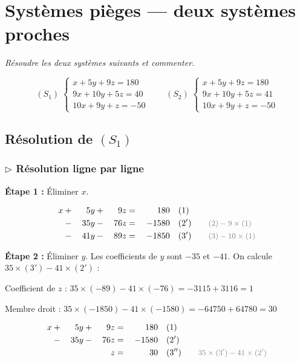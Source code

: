 \documentclass[12pt,a4paper]{article}
\newcommand{\ann}[1]{\qquad\textcolor{opcolor}{\text{\small #1}}}
\begin{document}
\section{Systèmes pièges --- deux systèmes proches}

\textit{Résoudre les deux systèmes suivants et commenter.}

\[
(S_1) \;
\begin{cases}
  x + 5y + 9z = 180 \\
  9x + 10y + 5z = 40 \\
  10x + 9y + z = -50
\end{cases}
\qquad
(S_2) \;
\begin{cases}
  x + 5y + 9z = 180 \\
  9x + 10y + 5z = 41 \\
  10x + 9y + z = -50
\end{cases}
\]

\subsection*{Résolution de $(S_1)$}

\subsubsection*{$\triangleright$ Résolution ligne par ligne}

\textbf{Étape 1 :} Éliminer $x$.

\begin{alignat*}{4}
  x &{}+{}&  5y  &{}+{}&  9z  &{}={}&  180   &\quad (1)\\
    &{}-{}& 35y  &{}-{}& 76z  &{}={}& -1580  &\quad (2') \ann{$(2)-9\times(1)$}\\
    &{}-{}& 41y  &{}-{}& 89z  &{}={}& -1850  &\quad (3') \ann{$(3)-10\times(1)$}
\end{alignat*}

\textbf{Étape 2 :} Éliminer $y$. Les coefficients de $y$ sont $-35$ et $-41$. On calcule $35\times(3') - 41\times(2')$ :

Coefficient de $z$ : $35\times(-89) - 41\times(-76) = -3115 + 3116 = 1$

Membre droit : $35\times(-1850) - 41\times(-1580) = -64750 + 64780 = 30$

\begin{alignat*}{4}
  x &{}+{}&  5y  &{}+{}& 9z &{}={}&  180   &\quad (1)\\
    &{}-{}& 35y  &{}-{}& 76z &{}={}& -1580  &\quad (2')\\
    &     &      &     &  z  &{}={}&  30    &\quad (3'') \ann{$35\times(3') - 41\times(2')$}
\end{alignat*}
\end{document}
